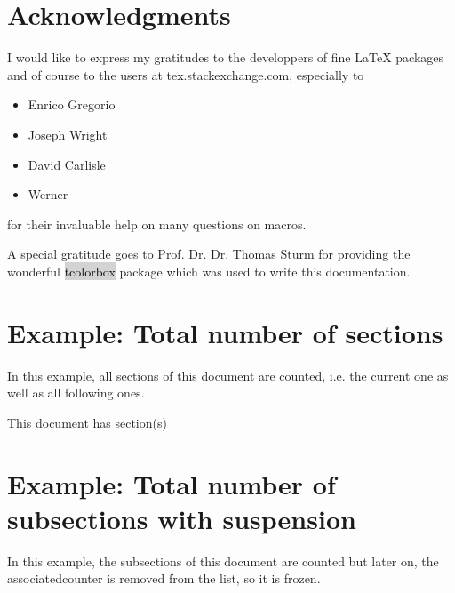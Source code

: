 \documentclass[12pt,paper=a4]{ltxdoc}
\newcommand{\MarkupPackageName}[2][lightgray]{%
\colorbox{#1}{\textcolor{black}{#2}}%
}%
\begin{document}
\clearpage

\section{Acknowledgments}

I would like to express my gratitudes to the developpers of fine \LaTeX{} packages and of course
to the users at tex.stackexchange.com, especially to

\begin{itemize}
  \item Enrico Gregorio
  \item Joseph Wright
  \item David Carlisle
  \item Werner 
\end{itemize}

for their invaluable help on many questions on macros.

\vspace{2\baselineskip}
A special gratitude goes to Prof. Dr. Dr. Thomas Sturm for providing the wonderful \MarkupPackageName{tcolorbox} package which was used to
write this documentation.

\clearpage

\appendix\label{examplesappendix}



\section[Total number of sections]{Example: Total number of sections}
In this example, all sections of this document are counted, i.e. the current one as well as all following ones.
\begin{dispExample}
%
This document has \number{} section(s)%
\end{dispExample}



\section[Subsection with suspension]{Example: Total number of subsections with suspension}

In this example, the subsections of this document are counted but later on, the associatedcounter is removed from the list, so it is frozen.

\end{document}
